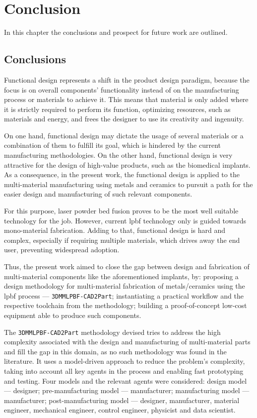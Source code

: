%
%
\chapter{Conclusion}%
\label{ch:conclusion}
In this chapter the conclusions and prospect for future work are outlined.

\section{Conclusions}
Functional design represents a shift in the product design paradigm, because the
focus is on overall components' functionality instead of on the manufacturing
process or materials to achieve it.
This means that material is only added where it is strictly required to perform
its function, optimizing resources, such as materials and energy, and frees the
designer to use its creativity and ingenuity.

On one hand, functional design may dictate the usage of several materials or a combination of them to fulfill its goal, which is hindered by the
current manufacturing methodologies.
On the other hand, functional design is very attractive for the design of high-value products, such
as the biomedical implants. As a consequence, in the present work, the functional design is applied to the
multi-material manufacturing using metals and ceramics to pursuit a path for the
easier design and manufacturing of such relevant components.

For this purpose, laser powder bed fusion proves to be
the most well suitable technology for the job. However, current \gls{lpbf}
technology only is guided towards mono-material fabrication. Adding to that,
functional design is hard and complex, especially if requiring multiple
materials, which drives away the end user, preventing widespread adoption.

Thus, the present work aimed to close the gap between design and fabrication of
multi-material components like the aforementioned implants, by: proposing a
design methodology for multi-material fabrication of metals/ceramics using the
\gls{lpbf} process --- \texttt{3DMMLPBF-CAD2Part};
instantiating a practical workflow and the respective toolchain from the
methodology; building a proof-of-concept low-cost equipment able to produce such
components.

The \texttt{3DMMLPBF-CAD2Part} methodology devised tries to address
the high complexity associated with the design and manufacturing of multi-material parts and fill the gap in this domain,
as no such methodology was found in the literature.
It uses a model-driven approach to reduce the problem's complexity, taking into account all key agents in the process and enabling
fast prototyping and testing. Four models and the relevant agents were
considered: design model --- designer; pre-manufacturing model ---
manufacturer; manufacturing model --- manufacturer; post-manufacturing model ---
designer, manufacturer, material engineer, mechanical engineer, control
engineer, physicist and data scientist.

